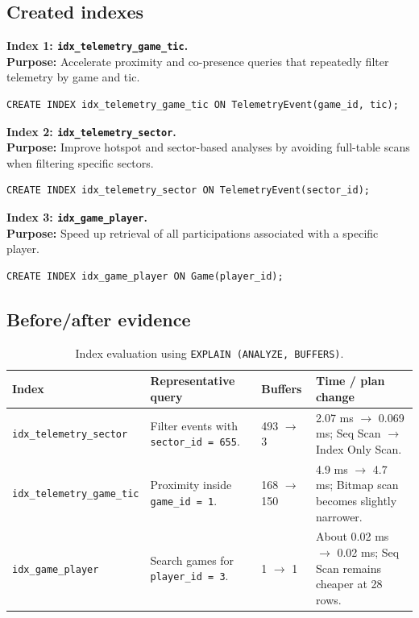 \documentclass[11pt]{article}
\begin{document}
\subsection{Created indexes}
\textbf{Index 1: \texttt{idx\_telemetry\_game\_tic}.} \\
\textbf{Purpose:} Accelerate proximity and co-presence queries that repeatedly filter telemetry by game and tic.
\begin{lstlisting}[style=sqlstyle]
CREATE INDEX idx_telemetry_game_tic ON TelemetryEvent(game_id, tic);
\end{lstlisting}

\textbf{Index 2: \texttt{idx\_telemetry\_sector}.} \\
\textbf{Purpose:} Improve hotspot and sector-based analyses by avoiding full-table scans when filtering specific sectors.
\begin{lstlisting}[style=sqlstyle]
CREATE INDEX idx_telemetry_sector ON TelemetryEvent(sector_id);
\end{lstlisting}

\textbf{Index 3: \texttt{idx\_game\_player}.} \\
\textbf{Purpose:} Speed up retrieval of all participations associated with a specific player.
\begin{lstlisting}[style=sqlstyle]
CREATE INDEX idx_game_player ON Game(player_id);
\end{lstlisting}

\subsection{Before/after evidence}
\begin{table}[H]
\centering
\footnotesize
\begin{tabular}{p{3.8cm}p{4.2cm}p{2.5cm}p{3.7cm}}
\toprule
\textbf{Index} & \textbf{Representative query} & \textbf{Buffers} & \textbf{Time / plan change} \\
\midrule
\texttt{idx\_telemetry\_sector} & Filter events with \texttt{sector\_id = 655}. & 493 $\rightarrow$ 3 & 2.07 ms $\rightarrow$ 0.069 ms; Seq Scan $\rightarrow$ Index Only Scan. \\
\texttt{idx\_telemetry\_game\_tic} & Proximity inside \texttt{game\_id = 1}. & 168 $\rightarrow$ 150 & 4.9 ms $\rightarrow$ 4.7 ms; Bitmap scan becomes slightly narrower. \\
\texttt{idx\_game\_player} & Search games for \texttt{player\_id = 3}. & 1 $\rightarrow$ 1 & About 0.02 ms $\rightarrow$ 0.02 ms; Seq Scan remains cheaper at 28 rows. \\
\bottomrule
\end{tabular}
\caption{Index evaluation using \texttt{EXPLAIN (ANALYZE, BUFFERS)}.}
\end{table}
\end{document}
